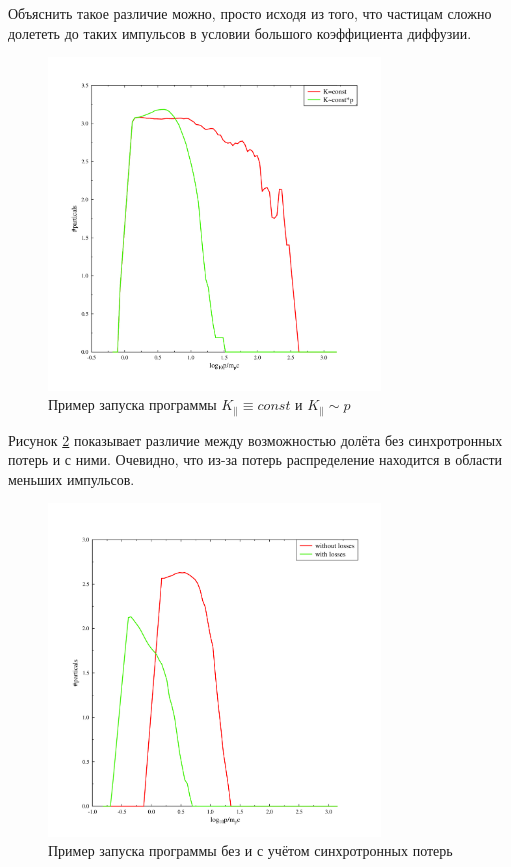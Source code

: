 \documentclass[a4paper,14pt]{extarticle} %
\begin{document}
Объяснить такое различие можно, просто исходя из того, что частицам сложно долететь до таких импульсов в условии большого коэффициента диффузии.
\begin{figure}[!htb]
\centering
\includegraphics[width=250pt]{stoh_bom_or_not}
\caption{Пример запуска программы $K_\parallel\equiv const$ и $K_\parallel \sim p $}
\label{res/stoh/bom}
\end{figure}
Рисунок \ref{res/stoh/sinh} показывает различие между возможностью долёта без синхротронных потерь и с ними. Очевидно, что из-за потерь распределение находится в области меньших импульсов. 
\begin{figure}[!htb]
\centering
\includegraphics[width=250pt]{stoh_sinh_or_not}
\caption{Пример запуска программы без и с учётом синхротронных потерь}
\label{res/stoh/sinh}
\end{figure}
\end{document}
